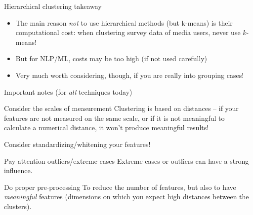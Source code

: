 \begin{frame}{Hierarchical clustering takeaway}
\begin{itemize}
\item The main reason \emph{not} to use hierarchical methods (but k-means) is their computational cost: when clustering survey data of media users, never use $k$-means!
\item But for NLP/ML, costs may be too high (if not used carefully)
\item Very much worth considering, though, if you are really into grouping cases!
\end{itemize}
\end{frame}


\begin{frame}{Important notes (for \emph{all} techniques today)}
\begin{block}{Consider the scales of measurement}
Clustering is based on distances -- if your features are not measured on the same scale, or if it is not meaningful to calculate a numerical distance, it won't produce meaningful results!

Consider standardizing/whitening your features!
\end{block}

\pause

\begin{block}{Pay attention outliers/extreme cases}
Extreme cases or outliers can have a strong influence.
\end{block}

\pause 
\begin{block}{Do proper pre-processing}
To reduce the number of features, but also to have \emph{meaningful} features (dimensions on which you expect high distances between the clusters).
\end{block}


\end{frame}




